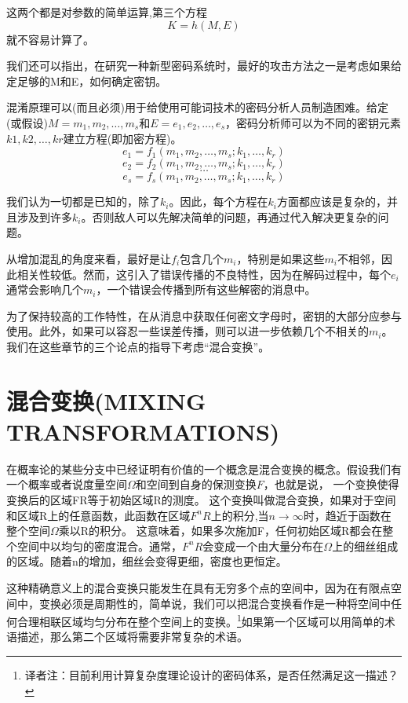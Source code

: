 \documentclass[]{article}
\begin{document}
这两个都是对参数的简单运算,第三个方程
\[K=h(M,E)\]
就不容易计算了。

我们还可以指出，在研究一种新型密码系统时，最好的攻击方法之一是考虑如果给定足够的M和E，如何确定密钥。

混淆原理可以(而且必须)用于给使用可能词技术的密码分析人员制造困难。给定(或假设)$M=m_1,m_2,\ldots,m_s$和$E=e_1,e_2,\ldots,e_s$，密码分析师可以为不同的密钥元素$k1,k2,\ldots,kr$建立方程(即加密方程)。
\[e_1=f_1(m_1,m_2,\ldots,m_s;k_1,\ldots,k_r)\]
\[e_2=f_2(m_1,m_2,\ldots,m_s;k_1,\ldots,k_r)\]
\[\ldots\]
\[e_s=f_s(m_1,m_2,\ldots,m_s;k_1,\ldots,k_r)\]

我们认为一切都是已知的，除了$k_i$。因此，每个方程在$k_i$方面都应该是复杂的，并且涉及到许多$k_i$。否则敌人可以先解决简单的问题，再通过代入解决更复杂的问题。

从增加混乱的角度来看，最好是让$f_i$包含几个$m_i$，特别是如果这些$m_i$不相邻，因此相关性较低。然而，这引入了错误传播的不良特性，因为在解码过程中，每个$e_i$通常会影响几个$m_i$，一个错误会传播到所有这些解密的消息中。

为了保持较高的工作特性，在从消息中获取任何密文字母时，密钥的大部分应参与使用。此外，如果可以容忍一些误差传播，则可以进一步依赖几个不相关的$m_i$。我们在这些章节的三个论点的指导下考虑“混合变换”。

\newpage
%   
%


\section{混合变换(MIXING TRANSFORMATIONS)}

在概率论的某些分支中已经证明有价值的一个概念是混合变换的概念。假设我们有一个概率或者说度量空间$\Omega$和空间到自身的保测变换$F$，也就是说，
一个变换使得变换后的区域FR等于初始区域R的测度。
这个变换叫做混合变换，如果对于空间和区域R上的任意函数，此函数在区域$F^{n}R$上的积分,当$n\rightarrow \infty$时，趋近于函数在整个空间$\Omega$乘以R的积分。
这意味着，如果多次施加F，任何初始区域R都会在整个空间中以均匀的密度混合。通常，$F^{n}R$会变成一个由大量分布在$\Omega$上的细丝组成的区域。随着n的增加，细丝会变得更细，密度也更恒定。

这种精确意义上的混合变换只能发生在具有无穷多个点的空间中，因为在有限点空间中，变换必须是周期性的，简单说，我们可以把混合变换看作是一种将空间中任何合理相联区域均匀分布在整个空间上的变换。\footnote{译者注：目前利用计算复杂度理论设计的密码体系，是否任然满足这一描述？}如果第一个区域可以用简单的术语描述，那么第二个区域将需要非常复杂的术语。
\end{document}

